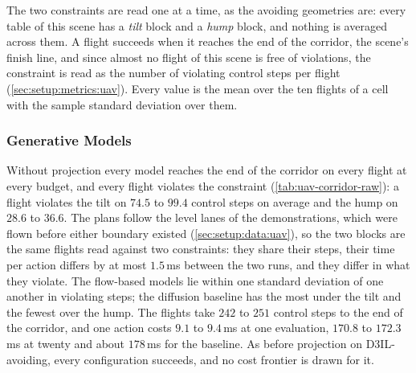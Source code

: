 The two constraints are read one at a time, as the avoiding geometries are: every table of this scene has a
\emph{tilt} block and a \emph{hump} block, and nothing is averaged across them. A flight succeeds when it
reaches the end of the corridor, the scene's finish line, and since almost no flight of this scene is free
of violations, the constraint is read as the number of violating control steps per flight
(\autoref{sec:setup:metrics:uav}). Every value is the mean over the ten flights of a cell with the sample
standard deviation over them.

\subsubsection{Generative Models}\label{sec:res:uav:corridor:raw}
Without projection every model reaches the end of the corridor on every flight at every budget, and every
flight violates the constraint (\autoref{tab:uav-corridor-raw}): a flight violates the tilt on $74.5$ to
$99.4$ control steps on average and the hump on $28.6$ to $36.6$. The plans follow the level lanes of the
demonstrations, which were flown before either boundary existed (\autoref{sec:setup:data:uav}), so the two
blocks are the same flights read against two constraints: they share their steps, their time per action
differs by at most $1.5$\,ms between the two runs, and they differ in what they violate. The flow-based
models lie within one standard deviation of one another in violating steps; the diffusion baseline has the
most under the tilt and the fewest over the hump. The flights take $242$ to $251$ control steps to the end
of the corridor, and one action costs $9.1$ to $9.4$\,ms at one evaluation, $170.8$ to $172.3$\,ms at
twenty and about $178$\,ms for the baseline. As before projection on D3IL-avoiding, every configuration
succeeds, and no cost frontier is drawn for it.

